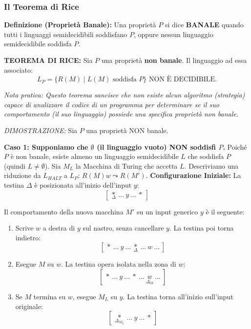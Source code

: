 \vspace{0.4cm}

\subsubsection{Il Teorema di Rice}

\textbf{Definizione (Proprietà Banale):} Una proprietà $P$ si dice \textbf{BANALE} quando tutti i linguaggi semidecidibili soddisfano $P$, oppure nessun linguaggio semidecidibile soddisfa $P$.

\vspace{0.2cm}
\textbf{TEOREMA DI RICE:} Sia $P$ una proprietà \textbf{non banale}. Il linguaggio ad essa associato:
$$ L_P = \{ R(M) \mid L(M) \text{ soddisfa } P \} \text{     NON È DECIDIBILE.}$$


\textit{Nota pratica: Questo teorema sancisce che non esiste alcun algoritmo (strategia) capace di analizzare il codice di un programma per determinare se il suo comportamento (il suo linguaggio) possiede una specifica proprietà non banale.}


\vspace{0.4cm}
\textit{DIMOSTRAZIONE:} 
Sia $P$ una proprietà NON banale. 

\textbf{Caso 1: Supponiamo che $\emptyset$ (il linguaggio vuoto) NON soddisfi $P$.}
Poiché $P$ è non banale, esiste almeno un linguaggio semidecidibile $L$ che soddisfa $P$ (quindi $L \neq \emptyset$). Sia $M_L$ la Macchina di Turing che accetta $L$.
Descriviamo una riduzione da $L_{HALT}$ a $L_P$: $R(M)w \leadsto R(M')$.
\vspace{0.2cm}
\textbf{Configurazione Iniziale:} La testina $\Delta$ è posizionata all'inizio dell'input $y$:
$$ [ \ \underset{\Delta}{\ast} \ \dots \ y \ \dots \ \ast \ ] $$

Il comportamento della nuova macchina $M'$ su un input generico $y$ è il seguente:
\begin{enumerate}
    \item Scrive $w$ a destra di $y$ sul nastro, senza cancellare $y$. La testina poi torna indietro:
    $$ [ \ \ast \ \dots \ y \ \dots \ \underset{\Delta}{\ast} \ \dots \ w \ \dots \ ] $$
    
    \item Esegue $M$ su $w$. La testina opera isolata nella zona di $w$:
    $$ [ \ \ast \ \dots \ y \ \dots \ \ast \ \dots \ \underset{\Delta_M}{w} \ \dots \ ] $$
    
    \item Se $M$ termina su $w$, esegue $M_L$ su $y$. La testina torna all'inizio sull'input originale:
    $$ [ \ \underset{\Delta_{M_L}}{\ast} \ \dots \ y \ \dots \ \ast \ ] $$
\end{enumerate}

